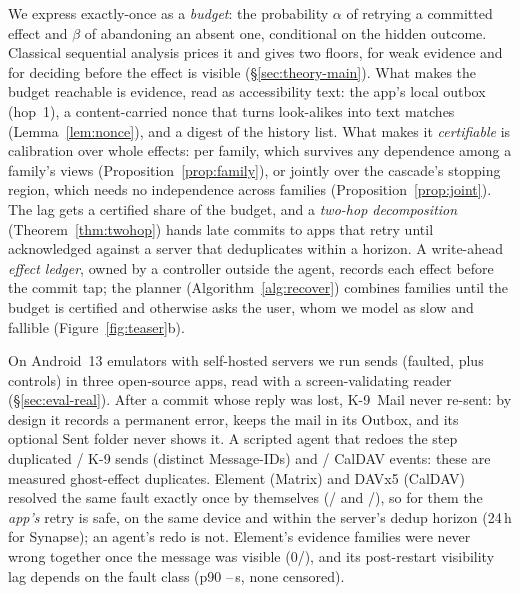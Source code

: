 We express exactly-once as a \emph{budget}: the probability $\alpha$ of retrying a committed effect and $\beta$ of abandoning an absent one, conditional on the hidden outcome.
Classical sequential analysis prices it and gives two floors, for weak evidence and for deciding before the effect is visible (\S\ref{sec:theory-main}). What makes the budget
reachable is evidence, read as accessibility text: the app's local outbox (hop~1), a content-carried nonce that turns look-alikes into text matches (Lemma~\ref{lem:nonce}), and a
digest of the history list. What makes it \emph{certifiable} is calibration over whole effects: per family, which survives any dependence among a family's views
(Proposition~\ref{prop:family}), or jointly over the cascade's stopping region, which needs no independence across families (Proposition~\ref{prop:joint}). The lag gets a
certified share of the budget, and a \emph{two-hop decomposition} (Theorem~\ref{thm:twohop}) hands late commits to apps that retry until acknowledged against a server that
deduplicates within a horizon. A write-ahead \emph{effect ledger}, owned by a controller outside the agent, records each effect before the commit tap; the \alg planner
(Algorithm~\ref{alg:recover}) combines families until the budget is certified and otherwise asks the user, whom we model as slow and fallible (Figure~\ref{fig:teaser}b).

 On Android~13 emulators with self-hosted servers we run \RealTwoN{} sends (faulted, plus controls) in three open-source apps, read with a screen-validating
reader (\S\ref{sec:eval-real}). After a commit whose reply was lost, K-9~Mail never re-sent: by design it records a permanent error, keeps the mail in its Outbox, and its
optional Sent folder never shows it. A scripted agent that redoes the step duplicated \RealKRecDup/\RealKRecN{} K-9 sends (distinct Message-IDs) and \RealCalRecDup/\RealCalRecN{}
CalDAV events: these are measured ghost-effect duplicates. Element (Matrix) and DAVx5 (CalDAV) resolved the same fault exactly once by themselves (\RealElemRL/\RealElemRL{}
and \RealCalN/\RealCalN), so for them the \emph{app's} retry is safe, on the same device and within the server's dedup horizon (24\,h for Synapse); an agent's redo is not.
Element's evidence families were never wrong together once the message was visible (0/\RealCoN), and its post-restart visibility lag depends on the fault class
(p90 \RealLagNetNinety--\RealLagFsNinety\,s, none censored).

